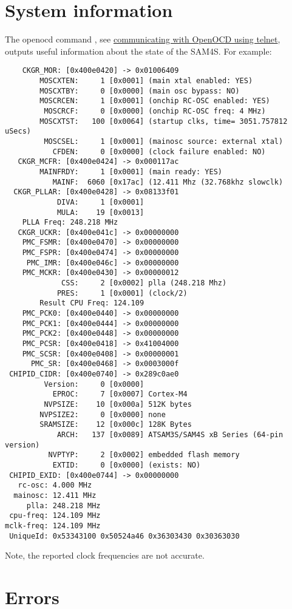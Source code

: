 \section{System information}
\label{system-information}


The openocd command , see
\hyperref[communicating-with-openocd-using-telnet]{communicating with
  OpenOCD using telnet}, outputs useful information about the state of
the SAM4S.  For example:
%
\begin{verbatim}
    CKGR_MOR: [0x400e0420] -> 0x01006409
	    MOSCXTEN:     1 [0x0001] (main xtal enabled: YES)
	    MOSCXTBY:     0 [0x0000] (main osc bypass: NO)
	    MOSCRCEN:     1 [0x0001] (onchip RC-OSC enabled: YES)
	     MOSCRCF:     0 [0x0000] (onchip RC-OSC freq: 4 MHz)
	    MOSCXTST:   100 [0x0064] (startup clks, time= 3051.757812 uSecs)
	     MOSCSEL:     1 [0x0001] (mainosc source: external xtal)
	       CFDEN:     0 [0x0000] (clock failure enabled: NO)
   CKGR_MCFR: [0x400e0424] -> 0x000117ac
	    MAINFRDY:     1 [0x0001] (main ready: YES)
	       MAINF:  6060 [0x17ac] (12.411 Mhz (32.768khz slowclk)
  CKGR_PLLAR: [0x400e0428] -> 0x08133f01
	        DIVA:     1 [0x0001]
	        MULA:    19 [0x0013]
	PLLA Freq: 248.218 MHz
   CKGR_UCKR: [0x400e041c] -> 0x00000000
    PMC_FSMR: [0x400e0470] -> 0x00000000
    PMC_FSPR: [0x400e0474] -> 0x00000000
     PMC_IMR: [0x400e046c] -> 0x00000000
    PMC_MCKR: [0x400e0430] -> 0x00000012
	         CSS:     2 [0x0002] plla (248.218 Mhz)
	        PRES:     1 [0x0001] (clock/2)
		Result CPU Freq: 124.109
    PMC_PCK0: [0x400e0440] -> 0x00000000
    PMC_PCK1: [0x400e0444] -> 0x00000000
    PMC_PCK2: [0x400e0448] -> 0x00000000
    PMC_PCSR: [0x400e0418] -> 0x41004000
    PMC_SCSR: [0x400e0408] -> 0x00000001
      PMC_SR: [0x400e0468] -> 0x0003000f
 CHIPID_CIDR: [0x400e0740] -> 0x289c0ae0
	     Version:     0 [0x0000]
	       EPROC:     7 [0x0007] Cortex-M4
	     NVPSIZE:    10 [0x000a] 512K bytes
	    NVPSIZE2:     0 [0x0000] none
	    SRAMSIZE:    12 [0x000c] 128K Bytes
	        ARCH:   137 [0x0089] ATSAM3S/SAM4S xB Series (64-pin version)
	      NVPTYP:     2 [0x0002] embedded flash memory
	       EXTID:     0 [0x0000] (exists: NO)
 CHIPID_EXID: [0x400e0744] -> 0x00000000
   rc-osc: 4.000 MHz
  mainosc: 12.411 MHz
     plla: 248.218 MHz
 cpu-freq: 124.109 MHz
mclk-freq: 124.109 MHz
 UniqueId: 0x53343100 0x50524a46 0x36303430 0x30363030
\end{verbatim}
%
Note, the reported clock frequencies are not accurate.


\section{Errors}
\label{openocd_errors}

